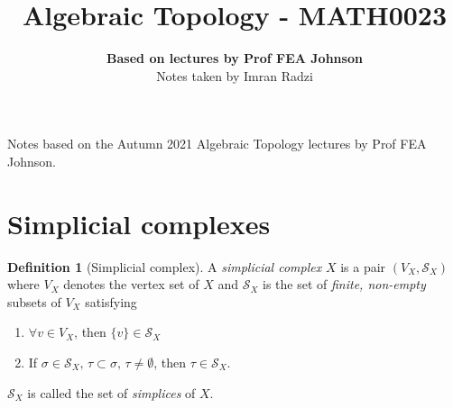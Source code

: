 \documentclass[a4paper,14pt]{extarticle}
\theoremstyle{definition}
\newtheorem*{definition}{Definition}
\begin{document}
\title{\textbf{Algebraic Topology - MATH0023}}
\author{\textbf{Based on lectures by Prof FEA Johnson}\\ Notes taken by Imran Radzi}
\date{}
\maketitle

Notes based on the Autumn 2021 Algebraic Topology lectures by Prof FEA Johnson.
\begingroup
\let\cleardoublepage\clearpage
\tableofcontents
\endgroup
\newpage
{}

\vspace{12pt}

\section{Simplicial complexes}

\begin{definition}[Simplicial complex]
	A \emph{simplicial complex} $X$ is a pair $(V_X,\mathcal{S}_X)$ where $V_X$ denotes the vertex set of $X$ and $\mathcal{S}_X$ is the set of
	\textit{finite, non-empty} subsets of $V_X$ satisfying
	\begin{enumerate}
		\item $\forall v\in V_X$, then $\{v\}\in\mathcal{S}_X$
		\item If $\sigma\in\mathcal{S}_X, \,\tau\subset\sigma, \,\tau\neq\emptyset$, then $\tau\in\mathcal{S}_X$. 
	\end{enumerate}
	$\mathcal{S}_X$ is called the set of \textit{simplices} of $X$.
\end{definition}
\end{document}
